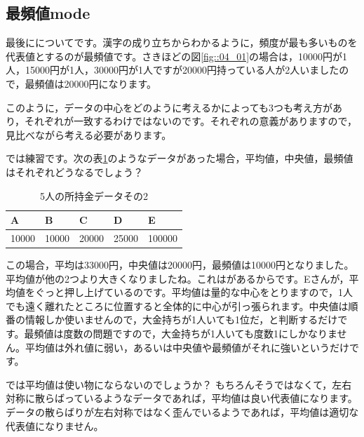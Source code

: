 \documentclass{ltjbook}
\begin{document}
\subsection{最頻値mode}
最後にについてです。漢字の成り立ちからわかるように，頻度が最も多いものを代表値とするのが最頻値です。さきほどの図\ref{fig::04_01}の場合は，10000円が1人，15000円が1人，30000円が1人ですが20000円持っている人が2人いましたので，最頻値は20000円になります。

このように，データの中心をどのように考えるかによっても3つも考え方があり，それぞれが一致するわけではないのです。それぞれの意義がありますので，見比べながら考える必要があります。

では練習です。次の表\ref{tbl::04_01}のようなデータがあった場合，平均値，中央値，最頻値はそれぞれどうなるでしょう？

\begin{table}[ht]
	\centering
	\caption{5人の所持金データその2}
	\begin{tabular}{lllll}
		A     & B     & C     & D     & E      \\\hline
		10000 & 10000 & 20000 & 25000 & 100000 \\
	\end{tabular}
	\label{tbl::04_01}
\end{table}

この場合，平均は33000円，中央値は20000円，最頻値は10000円となりました。平均値が他の2つより大きくなりましたね。これはがあるからです。Eさんが，平均値をぐっと押し上げているのです。平均値は量的な中心をとりますので，1人でも遠く離れたところに位置すると全体的に中心が引っ張られます。中央値は順番の情報しか使いませんので，大金持ちが1人いても1位だ，と判断するだけです。最頻値は度数の問題ですので，大金持ちが1人いても度数1にしかなりません。平均値は外れ値に弱い，あるいは中央値や最頻値がそれに強いというだけです。

では平均値は使い物にならないのでしょうか？ もちろんそうではなくて，左右対称に散らばっているようなデータであれば，平均値は良い代表値になります。データの散らばりが左右対称ではなく歪んでいるようであれば，平均値は適切な代表値になりません。
\end{document}

